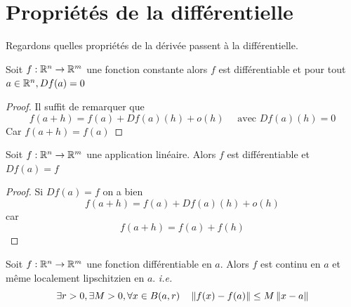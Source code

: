          \section{Propriétés de la différentielle}
         Regardons quelles propriétés de la dérivée passent à la différentielle.
         \begin{proposition}
             Soit $f:\mathbb{R}^n\to \mathbb{R} ^m$ une fonction constante alors $f$ est différentiable et pour tout $a\in \mathbb{R} ^n, Df(a)=0$ 
         \end{proposition}
         \begin{proof}
             Il suffit de remarquer que 
             \begin{equation}
                 f(a+h)=f(a)+Df(a)(h)+o(h)\quad  \text{ avec }Df(a)(h)=0
             \end{equation}
             Car $f(a+h)=f(a)$
         \end{proof}
         \begin{proposition}
             Soit $f:\mathbb{R} ^n\to \mathbb{R}^m$ une application linéaire. Alors $f$ est différentiable et $Df(a)=f$
         \end{proposition}
         \begin{proof}
             Si $Df(a) =f$ on a bien 
             \begin{equation*}
                 f(a+h)=f(a)+Df(a)(h)+o(h)
             \end{equation*}
             car
             \begin{equation*}
                 f(a+h)=f(a)+f(h)
             \end{equation*}
         \end{proof}
         \begin{proposition}
             Soit $f:\mathbb{R}^n\to \mathbb{R}^m$ une fonction différentiable en $a$. Alors $f$ est continu en $a$ et même localement lipschitzien en $a$. \textit{i.e.} 
             \begin{equation*}
             \exists r>0, \exists M>0, \forall x\in B(a,r) \quad \left\| f(x)-f(a) \right\|\leq M\left\| x-a \right\|
             \end{equation*}
        \end{proposition}
